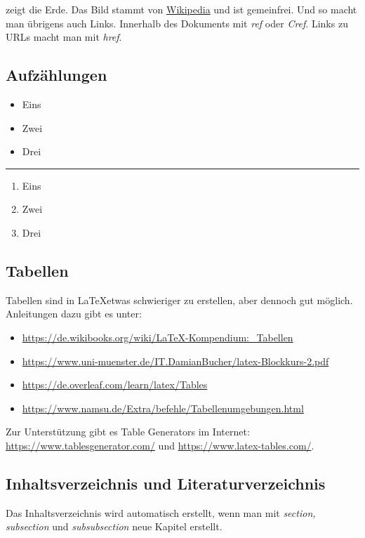 			 zeigt die Erde. Das Bild stammt von \href{https://de.wikipedia.org/wiki/Erde#/media/Datei:The_Earth_seen_from_Apollo_17.jpg}{Wikipedia} und ist gemeinfrei. Und so macht man übrigens auch Links. Innerhalb des Dokuments mit \emph{ref} oder \emph{Cref}. Links zu URLs macht man mit \emph{href}.
		
		\subsection{Aufzählungen}
			\begin{itemize}
				\item Eins
				\item Zwei
				\item Drei
			\end{itemize}
			\hrule
			\begin{enumerate}
				\item Eins
				\item Zwei
				\item Drei
			\end{enumerate}
		
		\subsection{Tabellen}
			Tabellen sind in \LaTeX\space etwas schwieriger zu erstellen, aber dennoch gut möglich. Anleitungen dazu gibt es unter:
			\begin{itemize}
				\item \url{https://de.wikibooks.org/wiki/LaTeX-Kompendium:_Tabellen}
				\item \url{https://www.uni-muenster.de/IT.DamianBucher/latex-Blockkurs-2.pdf}
				\item \url{https://de.overleaf.com/learn/latex/Tables}
				\item \url{https://www.namsu.de/Extra/befehle/Tabellenumgebungen.html}
			\end{itemize}
			
			Zur Unterstützung gibt es Table Generators im Internet: \url{https://www.tablesgenerator.com/} und \url{https://www.latex-tables.com/}.
		
		\subsection{Inhaltsverzeichnis und Literaturverzeichnis}
			Das Inhaltsverzeichnis wird automatisch erstellt, wenn man mit \emph{section, subsection} und \emph{subsubsection} neue Kapitel erstellt.
			
